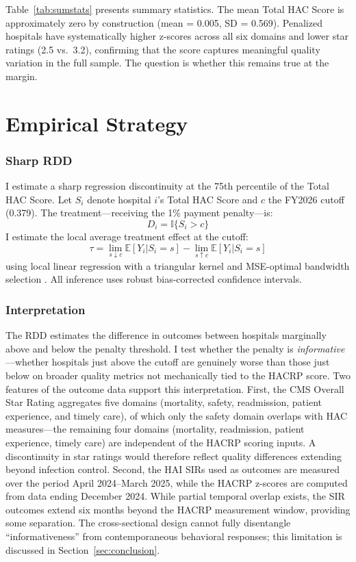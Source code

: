 \documentclass[12pt]{article}
\newcommand{\E}{\mathbb{E}}
\newcommand{\ind}{\mathbb{I}}
\begin{document}
Table~\ref{tab:sumstats} presents summary statistics. The mean Total HAC Score is approximately zero by construction (mean = 0.005, SD = 0.569). Penalized hospitals have systematically higher z-scores across all six domains and lower star ratings (2.5 vs.\ 3.2), confirming that the score captures meaningful quality variation in the full sample. The question is whether this remains true at the margin.




\section{Empirical Strategy}\label{sec:design}

\subsubsection*{Sharp RDD} I estimate a sharp regression discontinuity at the 75th percentile of the Total HAC Score. Let $S_i$ denote hospital $i$'s Total HAC Score and $c$ the FY2026 cutoff (0.379). The treatment---receiving the 1\% payment penalty---is:
\begin{equation}
D_i = \ind\{S_i > c\}
\end{equation}
I estimate the local average treatment effect at the cutoff:
\begin{equation}
\tau = \lim_{s \downarrow c} \E[Y_i | S_i = s] - \lim_{s \uparrow c} \E[Y_i | S_i = s]
\end{equation}
using local linear regression with a triangular kernel and MSE-optimal bandwidth selection \citep{calonico2014robust,calonico2020rdrobust}. All inference uses robust bias-corrected confidence intervals.

\subsubsection*{Interpretation} The RDD estimates the difference in outcomes between hospitals marginally above and below the penalty threshold. I test whether the penalty is \textit{informative}---whether hospitals just above the cutoff are genuinely worse than those just below on broader quality metrics not mechanically tied to the HACRP score. Two features of the outcome data support this interpretation. First, the CMS Overall Star Rating aggregates five domains (mortality, safety, readmission, patient experience, and timely care), of which only the safety domain overlaps with HAC measures---the remaining four domains (mortality, readmission, patient experience, timely care) are independent of the HACRP scoring inputs. A discontinuity in star ratings would therefore reflect quality differences extending beyond infection control. Second, the HAI SIRs used as outcomes are measured over the period April 2024--March 2025, while the HACRP z-scores are computed from data ending December 2024. While partial temporal overlap exists, the SIR outcomes extend six months beyond the HACRP measurement window, providing some separation. The cross-sectional design cannot fully disentangle ``informativeness'' from contemporaneous behavioral responses; this limitation is discussed in Section~\ref{sec:conclusion}.
\end{document}
